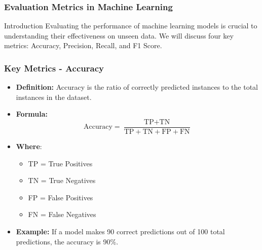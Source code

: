 \documentclass[aspectratio=169]{beamer}
\begin{document}
\begin{frame}[fragile]
    \frametitle{Evaluation Metrics in Machine Learning}
    \begin{block}{Introduction}
        Evaluating the performance of machine learning models is crucial to understanding their effectiveness on unseen data.
        We will discuss four key metrics: Accuracy, Precision, Recall, and F1 Score.
    \end{block}
\end{frame}

\begin{frame}[fragile]
    \frametitle{Key Metrics - Accuracy}
    \begin{itemize}
        \item \textbf{Definition:} Accuracy is the ratio of correctly predicted instances to the total instances in the dataset.
        \item \textbf{Formula:} 
        \[
        \text{Accuracy} = \frac{\text{TP} + \text{TN}}{\text{TP} + \text{TN} + \text{FP} + \text{FN}}
        \]
        \item \textbf{Where}:
        \begin{itemize}
            \item TP = True Positives
            \item TN = True Negatives
            \item FP = False Positives
            \item FN = False Negatives
        \end{itemize}
        \item \textbf{Example:} If a model makes 90 correct predictions out of 100 total predictions, the accuracy is 90\%.
    \end{itemize}
\end{frame}
\end{document}
